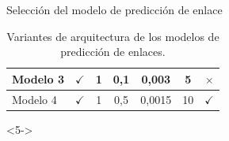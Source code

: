 \documentclass{beamer}
\begin{document}
\begin{frame}{Selección del modelo de predicción de enlace}
\begin{onlyenv}
\begin{table}
\begin{center}
{\begin{tabular}{|l|c|c|c|c|c|c|}
                Modelo 3	             & $\checkmark$	 &  1       & 0,1              & 0,003             & 5	       & $\times$            \\ \hline
                Modelo 4	             & $\checkmark$	 &  1       & 0,5              & 0,0015            & 10	       & $\checkmark$        \\ \hline
                \end{tabular}
                }
            \caption{Variantes de arquitectura de los modelos de predicción de enlaces.}\label{table:link_predictor_architecture_table}
            \end{center}
        \end{table}
    \end{onlyenv}
    \begin{onlyenv}<5->
        \begin{table}
            \begin{center}
            \caption{Métricas de predicción de relaciones de las pruebas del predictor de enlace.}\label{table:test_relation_metrics_link_predictor}
            \end{center}
        \end{table}
    \end{onlyenv}
\end{frame}
\end{document}
